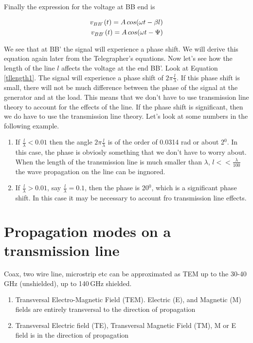 \documentclass{ximera}
\begin{document}
Finally the expression for the voltage at BB end is


\begin{eqnarray}
v_{BB^`}(t)=A \, cos(\omega t - \beta l) \\
v_{BB^`}(t)=A \, cos(\omega t - \Psi)
\end{eqnarray}

We see that at BB' the signal will experience a phase shift.
We will derive this equation  again later from the Telegrapher's
equations.
Now let's see how the length of the line $l$ affects the voltage at the
end BB'. Look at Equation \ref{tllength1}.
The signal will experience a phase shift of $2\pi \frac{l}{\lambda}$. If this phase shift is small, there will not be much difference between
the phase of the signal at the generator and at the load. This means that we don't have to use transmission line theory to account for the effects of the line.
If the phase shift is significant, then we do have to use the transmission line theory. Let's look at some numbers in the  following example.

\begin{enumerate}
\item If $\frac{l}{\lambda} < 0.01$ then the angle $2 \pi
\frac{l}{\lambda}$ is of the order of 0.0314 rad or about 2$^0$. In this case, the
phase is obviosly something that we don't have to worry about. When
the length of the transmission line is much smaller than $\lambda$, $l<<\frac{\lambda}{100}$
the wave propagation on the line can be ingnored.
\item If  $\frac{l}{\lambda} > 0.01$, say  $\frac{l}{\lambda} =0.1$,
then the phase is 20$^0$, which is a significant phase shift. In this
case it may be necessary to account fro transmission line effects.
\end{enumerate}



\section{Propagation modes on a transmission line}

Coax, two wire line, microstrip etc can be approximated as TEM up to
the 30-40\,GHz (unshielded), up to 140\,GHz shielded.




\begin{enumerate}
\item Transversal Electro-Magnetic Field (TEM). Electric (E), and Magnetic (M) fields are entirely transversal to the direction of
propagation
\item Transversal Electric field (TE), Transversal Magnetic Field (TM),  M or E field is in the direction of propagation
\end{enumerate}
\end{document}
